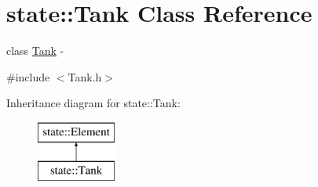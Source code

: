 \hypertarget{classstate_1_1_tank}{}\section{state\+:\+:Tank Class Reference}
\label{classstate_1_1_tank}


class \hyperlink{classstate_1_1_tank}{Tank} -\/  




{\ttfamily \#include $<$Tank.\+h$>$}

Inheritance diagram for state\+:\+:Tank\+:\begin{figure}[H]
\begin{center}
\leavevmode
\includegraphics[height=2.000000cm]{classstate_1_1_tank}
\end{center}
\end{figure}
